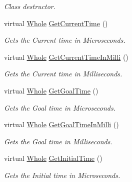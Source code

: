 \begin{DoxyCompactItemize}
\begin{DoxyCompactList}\small\item\em Class destructor. \item\end{DoxyCompactList}\item 
virtual \hyperlink{namespaceMezzanine_adcbb6ce6d1eb4379d109e51171e2e493}{Whole} \hyperlink{classMezzanine_1_1SimpleTimer_adfd244c4a9073eb5b0b1f5e2dffec55f}{GetCurrentTime} ()
\begin{DoxyCompactList}\small\item\em Gets the Current time in Microseconds. \item\end{DoxyCompactList}\item 
virtual \hyperlink{namespaceMezzanine_adcbb6ce6d1eb4379d109e51171e2e493}{Whole} \hyperlink{classMezzanine_1_1SimpleTimer_a17038a95d208b1998ea7642a64c7b926}{GetCurrentTimeInMilli} ()
\begin{DoxyCompactList}\small\item\em Gets the Current time in Milliseconds. \item\end{DoxyCompactList}\item 
virtual \hyperlink{namespaceMezzanine_adcbb6ce6d1eb4379d109e51171e2e493}{Whole} \hyperlink{classMezzanine_1_1SimpleTimer_afa2889dc18b435749a64d704e400e382}{GetGoalTime} ()
\begin{DoxyCompactList}\small\item\em Gets the Goal time in Microseconds. \item\end{DoxyCompactList}\item 
virtual \hyperlink{namespaceMezzanine_adcbb6ce6d1eb4379d109e51171e2e493}{Whole} \hyperlink{classMezzanine_1_1SimpleTimer_aa1b5e26e12e6931e8c24e5a9827ad3cd}{GetGoalTimeInMilli} ()
\begin{DoxyCompactList}\small\item\em Gets the Goal time in Milliseconds. \item\end{DoxyCompactList}\item 
virtual \hyperlink{namespaceMezzanine_adcbb6ce6d1eb4379d109e51171e2e493}{Whole} \hyperlink{classMezzanine_1_1SimpleTimer_a526c7d66f76d12de1e604087c146f457}{GetInitialTime} ()
\begin{DoxyCompactList}\small\item\em Gets the Initial time in Microseconds. \item\end{DoxyCompactList}\item 

\end{DoxyCompactItemize}
